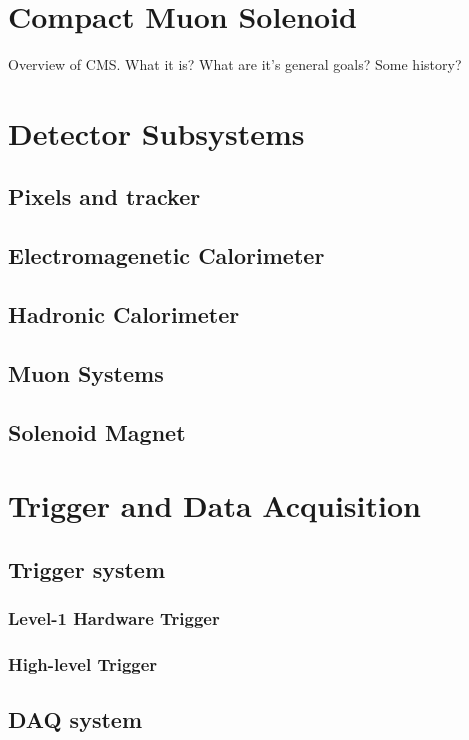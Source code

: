 \section{Compact Muon Solenoid}  %
\label{sec:detector_overview}

Overview of CMS. What it is? What are it's general goals? Some history?


\section{Detector Subsystems}  %
\label{sec:detector_subsystems}

\subsection{Pixels and tracker}

\subsection{Electromagenetic Calorimeter}

\subsection{Hadronic Calorimeter}

\subsection{Muon Systems}

\subsection{Solenoid Magnet}


\section{Trigger and Data Acquisition}  %
\label{sec:detector_daq}

\subsection{Trigger system}

\subsubsection{Level-1 Hardware Trigger}

\subsubsection{High-level Trigger}

\subsection{DAQ system}

